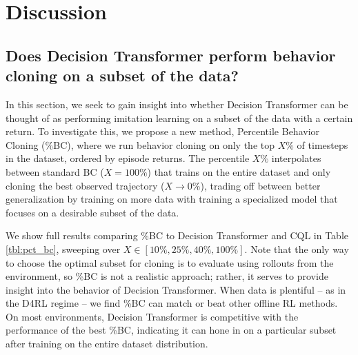 
\section{Discussion}

\subsection{Does Decision Transformer perform behavior cloning on a subset of the data?}
\label{sec:pct_bc}

In this section, we seek to gain insight into whether Decision Transformer can be thought of as performing imitation learning on a subset of the data with a certain return.
To investigate this, we propose a new method, Percentile Behavior Cloning (\%BC), where we run behavior cloning on only the top $X\%$ of timesteps in the dataset, ordered by episode returns.
The percentile $X\%$ interpolates between standard BC ($X=100\%$) that trains on the entire dataset and only cloning the best observed trajectory ($X\to0\%$), trading off between better generalization by training on more data with training a specialized model that focuses on a desirable subset of the data.

We show full results comparing \%BC to Decision Transformer and CQL in Table \ref{tbl:pct_bc}, sweeping over $X \in [10\%, 25\%, 40\%, 100\%]$.
Note that the only way to choose the optimal subset for cloning is to evaluate using rollouts from the environment, so \%BC is not a realistic approach; rather, it serves to provide insight into the behavior of Decision Transformer.
When data is plentiful -- as in the D4RL regime -- we find \%BC can match or beat other offline RL methods.
On most environments, Decision Transformer is competitive with the performance of the best \%BC, indicating it can hone in on a particular subset after training on the entire dataset distribution.


